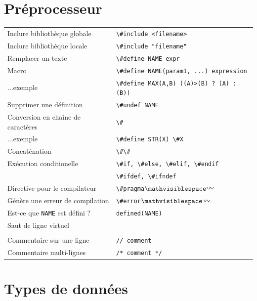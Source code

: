 \documentclass{article}
\newcommand{\any}{$\hzigzag$~}
\newcommand{\spc}{$\mathvisiblespace$}
\newcommand{\cd}{\lstinline}
\begin{document}
\begin{multicols*}{3}
\section*{Préprocesseur}
\begin{tabularx}{\linewidth}{Xl}
  Inclure bibliothèque globale       & \cd{\#include <filename>} \\
  Inclure bibliothèque locale        & \cd{\#include "filename"} \\
  Remplacer un texte                 & \cd{\#define NAME expr} \\
  Macro                              & \cd{\#define NAME(param1, ...) expression} \\
  ...exemple                         & \cd{\#define MAX(A,B) ((A)>(B) ? (A) : (B))} \\
  Supprimer une définition           & \cd{\#undef NAME} \\
  Conversion en chaîne de caractères & \cd{\#} \\
  ...exemple                         & \cd{\#define STR(X) \#X} \\
  Concaténation                      & \cd{\#\#} \\
  Exécution conditionelle            & \cd{\#if, \#else, \#elif, \#endif} \\
                                     & \cd{\#ifdef, \#ifndef} \\
  Directive pour le compilateur      & \cd{\#pragma}\tt\spc \any \\
  Génère une erreur de compilation   & \cd{\#error}\tt\spc \any \\
  Est-ce que \cd{NAME} est défini ?  & \cd{defined(NAME)} \\
  Saut de ligne virtuel              & \cd{\\} \\
  Commentaire sur une ligne          & \cd{// comment} \\
  Commentaire multi-lignes           & \cd{/* comment */} \\
\end{tabularx}

\section*{Types de données}


\end{multicols*}
\end{document}
